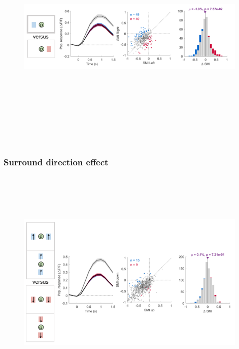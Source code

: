 \begin{figure}[H] \centering \includegraphics[width=11cm,height=11cm,keepaspectratio]{Figures/7.Results/finalPopulation/sel/diagrams/3.png} 
\end{figure}

\subsubsection{Surround direction effect}

\begin{figure}[H] \centering \includegraphics[width=11cm,height=11cm,keepaspectratio]{Figures/7.Results/finalPopulation/sel/diagrams/4.png} 
\end{figure}

